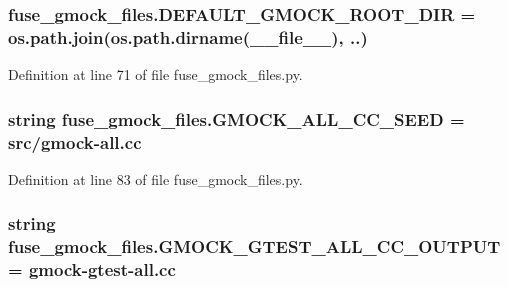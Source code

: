 \subsubsection[{\texorpdfstring{D\+E\+F\+A\+U\+L\+T\+\_\+\+G\+M\+O\+C\+K\+\_\+\+R\+O\+O\+T\+\_\+\+D\+IR}{DEFAULT_GMOCK_ROOT_DIR}}]{\setlength{\rightskip}{0pt plus 5cm}fuse\+\_\+gmock\+\_\+files.\+D\+E\+F\+A\+U\+L\+T\+\_\+\+G\+M\+O\+C\+K\+\_\+\+R\+O\+O\+T\+\_\+\+D\+IR = os.\+path.\+join(os.\+path.\+dirname(\+\_\+\+\_\+file\+\_\+\+\_\+), \textquotesingle{}..\textquotesingle{})}\hypertarget{namespacefuse__gmock__files_a900b64b34e20c7430b72252192a3c7ed}{}\label{namespacefuse__gmock__files_a900b64b34e20c7430b72252192a3c7ed}


Definition at line 71 of file fuse\+\_\+gmock\+\_\+files.\+py.

\subsubsection[{\texorpdfstring{G\+M\+O\+C\+K\+\_\+\+A\+L\+L\+\_\+\+C\+C\+\_\+\+S\+E\+ED}{GMOCK_ALL_CC_SEED}}]{\setlength{\rightskip}{0pt plus 5cm}string fuse\+\_\+gmock\+\_\+files.\+G\+M\+O\+C\+K\+\_\+\+A\+L\+L\+\_\+\+C\+C\+\_\+\+S\+E\+ED = \textquotesingle{}src/gmock-\/{\bf all.\+cc}\textquotesingle{}}\hypertarget{namespacefuse__gmock__files_a518e1f3cc3f184747e6ed3f2d0233c99}{}\label{namespacefuse__gmock__files_a518e1f3cc3f184747e6ed3f2d0233c99}


Definition at line 83 of file fuse\+\_\+gmock\+\_\+files.\+py.

\subsubsection[{\texorpdfstring{G\+M\+O\+C\+K\+\_\+\+G\+T\+E\+S\+T\+\_\+\+A\+L\+L\+\_\+\+C\+C\+\_\+\+O\+U\+T\+P\+UT}{GMOCK_GTEST_ALL_CC_OUTPUT}}]{\setlength{\rightskip}{0pt plus 5cm}string fuse\+\_\+gmock\+\_\+files.\+G\+M\+O\+C\+K\+\_\+\+G\+T\+E\+S\+T\+\_\+\+A\+L\+L\+\_\+\+C\+C\+\_\+\+O\+U\+T\+P\+UT = \textquotesingle{}gmock-\/{\bf gtest}-\/{\bf all.\+cc}\textquotesingle{}}\hypertarget{namespacefuse__gmock__files_a9759f3f6c404e3292c26c9317792e846}{}\label{namespacefuse__gmock__files_a9759f3f6c404e3292c26c9317792e846}



